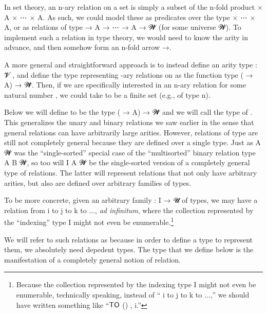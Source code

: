 In set theory, an \ab n-ary relation on a set  is simply a subset of the \ab n-fold product  \ad × \ab A \ad × \as ⋯ \ad × \ab A. As such, we could model these as predicates over the type  \ad × \as ⋯ \ad × \ab A, or as relations of type  \as → \ab A \as → \as ⋯ \as → \ab A \as → \ab 𝓦\af ̇ (for some universe \ab 𝓦). To implement such a relation in type theory, we would need to know the arity in advance, and then somehow form an \ab n-fold arrow \as →.

A more general and straightforward approach is to instead define an arity type  \as : \ab 𝓥\af ̇ , and define the type representing -ary relations on  as the function type ( \as → \ab A) \as → \ab 𝓦\af ̇. Then, if we are specifically interested in an \ab n-ary relation for some natural number , we could take  to be a finite set (e.g., of type  n).

Below we will define  to be the type ( \as → \ab A) \as → \ab 𝓦\af ̇ and we will call  the type of . This generalizes the unary and binary relations we saw earlier in the sense that general relations can have arbitrarily large arities. However, relations of type  are still not completely general because they are defined over a single type. Just as  \ab A \ab 𝓦 was the ``single-sorted'' special case of the ``multisorted'' binary relation type  \ab A \ab B \ab 𝓦, so too will  \ab I \ab A \ab 𝓦 be the single-sorted version of a completely general type of relations. The latter will represent relations that not only have arbitrary arities, but also are defined over arbitrary families of types.

To be more concrete, given an arbitrary family  \as : \ab I \as → \ab 𝓤\af ̇ of types, we may have a relation from  \ab i to  \ab j to  \ab k to $\ldots$, \textit{ad infinitum}, where the collection represented by the ``indexing'' type \ab I might not even be enumerable.\footnote{Because the collection represented by the indexing type \ab I might not even be enumerable, technically speaking, instead of `` \ab i to  \ab j to  \ab k to $\ldots$,'' we should have written something like ``$\mathsf{\af{TO}}$ () ,  \ab i.''}

We will refer to such relations as  because in order to define a type to represent them, we absolutely need depedent types. The  type that we define below is the manifestation of a completely general notion of relation.


